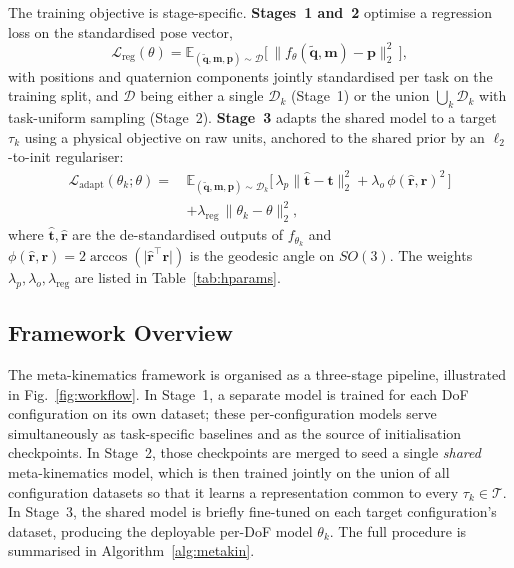 \documentclass[conference]{IEEEtran}
\begin{document}
The training objective is stage-specific. \textbf{Stages~1 and~2} optimise a regression loss on the standardised pose vector,
\begin{equation}
\mathcal{L}_{\mathrm{reg}}(\theta) = \mathbb{E}_{(\tilde{\mathbf{q}}, \mathbf{m}, \mathbf{p}) \sim \mathcal{D}}
\bigl[\,\lVert f_\theta(\tilde{\mathbf{q}}, \mathbf{m}) - \mathbf{p} \rVert_2^2\,\bigr],
\label{eq:loss_reg}
\end{equation}
with positions and quaternion components jointly standardised per task on the training split, and $\mathcal{D}$ being either a single $\mathcal{D}_k$ (Stage~1) or the union $\bigcup_k \mathcal{D}_k$ with task-uniform sampling (Stage~2). \textbf{Stage~3} adapts the shared model to a target $\tau_k$ using a physical objective on raw units, anchored to the shared prior by an $\ell_2$-to-init regulariser:
\begin{equation}
\begin{split}
\mathcal{L}_{\mathrm{adapt}}(\theta_k; \theta) =\,&
\mathbb{E}_{(\tilde{\mathbf{q}}, \mathbf{m}, \mathbf{p}) \sim \mathcal{D}_k}
\bigl[\,\lambda_p \lVert \hat{\mathbf{t}} - \mathbf{t} \rVert_2^2
+ \lambda_o\, \phi(\hat{\mathbf{r}}, \mathbf{r})^2\,\bigr] \\
&+ \lambda_{\mathrm{reg}}\,\lVert \theta_k - \theta \rVert_2^2,
\end{split}
\label{eq:loss_adapt}
\end{equation}
where $\hat{\mathbf{t}}, \hat{\mathbf{r}}$ are the de-standardised outputs of $f_{\theta_k}$ and $\phi(\hat{\mathbf{r}}, \mathbf{r}) = 2\arccos(\lvert \hat{\mathbf{r}}^{\top} \mathbf{r} \rvert)$ is the geodesic angle on $SO(3)$. The weights $\lambda_p, \lambda_o, \lambda_{\mathrm{reg}}$ are listed in Table~\ref{tab:hparams}.

\subsection{Framework Overview}
\label{sec:framework}

The meta-kinematics framework is organised as a three-stage pipeline, illustrated in Fig.~\ref{fig:workflow}. In Stage~1, a separate model is trained for each DoF configuration on its own dataset; these per-configuration models serve simultaneously as task-specific baselines and as the source of initialisation checkpoints. In Stage~2, those checkpoints are merged to seed a single \emph{shared} meta-kinematics model, which is then trained jointly on the union of all configuration datasets so that it learns a representation common to every $\tau_k \in \mathcal{T}$. In Stage~3, the shared model is briefly fine-tuned on each target configuration's dataset, producing the deployable per-DoF model $\theta_k$. The full procedure is summarised in Algorithm~\ref{alg:metakin}.
\end{document}
